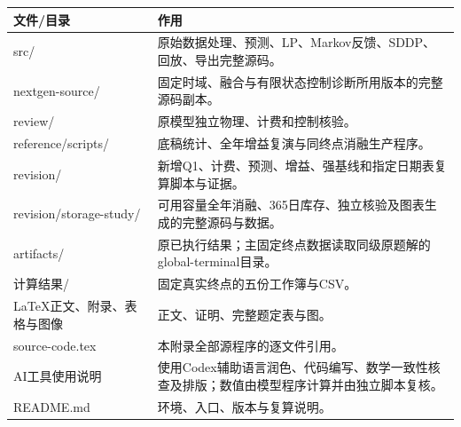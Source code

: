 \begin{longtable}{p{4.2cm}p{10cm}}\toprule 文件/目录&作用\\\midrule
src/&原始数据处理、预测、LP、Markov反馈、SDDP、回放、导出完整源码。\\
nextgen-source/&固定时域、融合与有限状态控制诊断所用版本的完整源码副本。\\
review/&原模型独立物理、计费和控制核验。\\
reference/scripts/&底稿统计、全年增益复演与同终点消融生产程序。\\
revision/&新增Q1、计费、预测、增益、强基线和指定日期表复算脚本与证据。\\
revision/storage-study/ & 可用容量全年消融、365日库存、独立核验及图表生成的完整源码与数据。\\
artifacts/&原已执行结果；主固定终点数据读取同级原题解的global-terminal目录。\\
计算结果/&固定真实终点的五份工作簿与CSV。\\
LaTeX正文、附录、表格与图像&正文、证明、完整题定表与图。\\
source-code.tex&本附录全部源程序的逐文件引用。\\
AI工具使用说明&使用Codex辅助语言润色、代码编写、数学一致性核查及排版；数值由模型程序计算并由独立脚本复核。\\
README.md&环境、入口、版本与复算说明。\\\bottomrule\end{longtable}